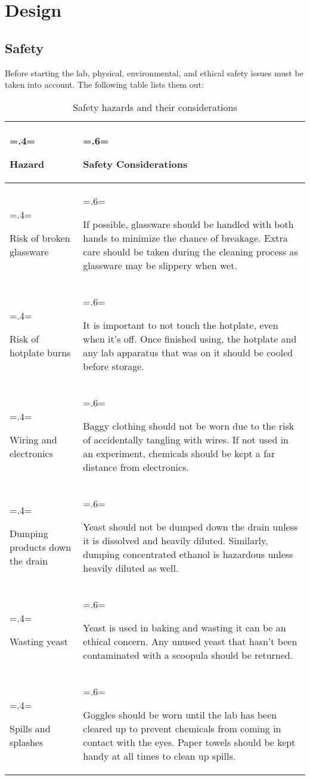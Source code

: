 \documentclass{article}
\begin{document}
\section{Design}

\newpage

\subsection{Safety}
Before starting the lab, physical, environmental, and ethical safety issues must be taken into account. The following table lists them out:
\begin{table}[H]
\centering
\caption{Safety hazards and their considerations}
\label{table:1}
\begin{tabularx}{\textwidth} {
    | >{\hsize=.4\hsize \linewidth=\hsize \raggedright\arraybackslash}X
    | >{\hsize=.6\hsize \linewidth=\hsize \raggedright\arraybackslash}X |
}
    \hline
    \rowcolor[HTML]{CCCCCC} Hazard & Safety Considerations \\
    \hline
    Risk of broken glassware & If possible, glassware should be handled with both hands to minimize the chance of breakage. Extra care should be taken during the cleaning process as glassware may be slippery when wet.\\
    \hline
    Risk of hotplate burns & It is important to not touch the hotplate, even when it's off. Once finished using, the hotplate and any lab apparatus that was on it should be cooled before storage.\\
    \hline
    Wiring and electronics & Baggy clothing should not be worn due to the risk of accidentally tangling with wires. If not used in an experiment, chemicals should be kept a far distance from electronics.\\
    \hline
    Dumping products down the drain & Yeast should not be dumped down the drain unless it is dissolved and heavily diluted. Similarly, dumping concentrated ethanol is hazardous unless heavily diluted as well. \parencite{ref}\\
    \hline
    Wasting yeast & Yeast is used in baking and wasting it can be an ethical concern. Any unused yeast that hasn't been contaminated with a scoopula should be returned.\\
    \hline
    Spills and splashes & Goggles should be worn until the lab has been cleared up to prevent chemicals from coming in contact with the eyes. Paper towels should be kept handy at all times to clean up spills.\\
    \hline
\end{tabularx}
\end{table}
\end{document}
